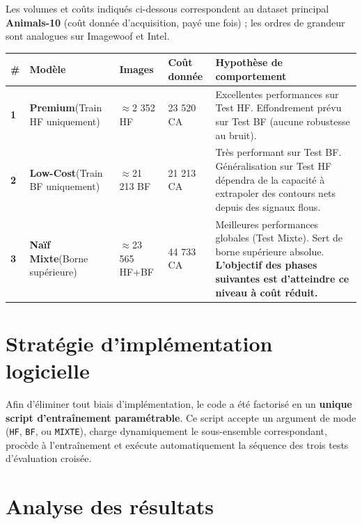 \documentclass[11pt,a4paper,openany]{book}
\newcommand{\tableheadcolor}{\rowcolor{headerbg}}
\newcommand{\tablerowodd}{}
\begin{document}
Les volumes et coûts indiqués ci-dessous correspondent au dataset principal \textbf{Animals-10} (coût donnée d'acquisition, payé une fois) ; les ordres de grandeur sont analogues sur Imagewoof et Intel.

\vspace{0.6em}
\renewcommand{\arraystretch}{1.6}
\begin{tabularx}{\linewidth}{C{0.5cm} L{2cm} C{1.6cm} C{2cm} L{8.8cm}}
  \toprule
  \tableheadcolor
  \textbf{\#} &
  \textbf{Modèle} &
  \textbf{Images} &
  \textbf{Coût donnée} &
  \textbf{Hypothèse de comportement} \\
  \midrule
  \tablerowodd
  \textbf{1} &
  \textbf{Premium}\newline\footnotesize(Train HF uniquement) &
  $\approx$2 352 HF &
  23 520 CA &
  Excellentes performances sur Test HF. Effondrement prévu sur Test BF (aucune robustesse au bruit). \\

  \textbf{2} &
  \textbf{Low-Cost}\newline\footnotesize(Train BF uniquement) &
  $\approx$21 213 BF &
  21 213 CA &
  Très performant sur Test BF. Généralisation sur Test HF dépendra de la capacité à extrapoler des contours nets depuis des signaux flous. \\
  \tablerowodd
  \textbf{3} &
  \textbf{Naïf Mixte}\newline\footnotesize(Borne supérieure) &
  $\approx$23 565 HF+BF &
  44 733 CA &
  Meilleures performances globales (Test Mixte). Sert de borne supérieure absolue. \textbf{L'objectif des phases suivantes est d'atteindre ce niveau à coût réduit.} \\
  \bottomrule
\end{tabularx}

\section{Stratégie d'implémentation logicielle}

Afin d'éliminer tout biais d'implémentation, le code a été factorisé en un \textbf{unique script d'entraînement paramétrable}. Ce script accepte un argument de mode (\texttt{HF}, \texttt{BF}, ou \texttt{MIXTE}), charge dynamiquement le sous-ensemble correspondant, procède à l'entraînement et exécute automatiquement la séquence des trois tests d'évaluation croisée.

\section{Analyse des résultats}
\end{document}
